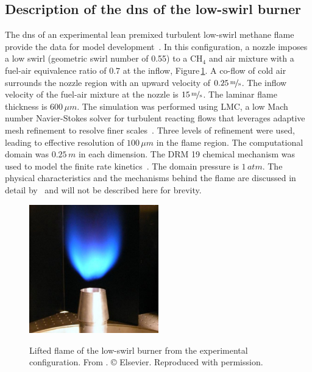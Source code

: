 \documentclass[review]{elsarticle}
\begin{document}
\subsection{Description of the \acrlong{dns} of the low-swirl burner}\label{sec:dns}
The \gls{dns} of an experimental lean premixed turbulent low-swirl
methane flame provide the data for model
development~\cite{Day2012,Cheng2000}. In this configuration, a nozzle
imposes a low swirl (geometric swirl number of 0.55) to a CH$_4$ and
air mixture with a fuel-air equivalence ratio of 0.7 at the inflow, Figure\,\ref{fig:exp_lsb}. A
co-flow of cold air surrounds the nozzle region with an upward
velocity of $0.25\,\unitfrac{m}{s}$. The inflow velocity of the
fuel-air mixture at the nozzle is $15\,\unitfrac{m}{s}$. The laminar
flame thickness is $600\,\unit{\mu m}$. The simulation was performed
using LMC, a low Mach number Navier-Stokes solver for turbulent
reacting flows that leverages adaptive mesh refinement to resolve
finer scales~\cite{Day2000}. Three levels of refinement were used,
leading to effective resolution of $100\,\unit{\mu m}$ in the flame
region. The computational domain was $0.25\,\unit{m}$ in each
dimension. The DRM 19 chemical mechanism was used to model the finite
rate kinetics~\cite{Kazakov1994}. The domain pressure is
$1\,\unit{atm}$. The physical characteristics and the mechanisms behind the flame are discussed in detail by~\citet{Day2012} and will not be described here for brevity. 

\begin{figure}[!tbp]%
  \centering%
  \includegraphics[width=0.5\textwidth]{./figs/exp_lsb.png}\\%
  \caption{Lifted flame of the low-swirl burner from the experimental configuration. From \citet{Day2012}. \copyright{} Elsevier. Reproduced with permission.}\label{fig:exp_lsb}%
\end{figure}%
\end{document}
